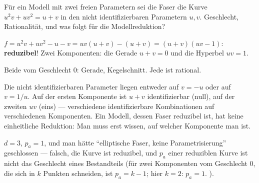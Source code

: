 \begin{aufgabe}
Für ein Modell mit zwei freien Parametern sei die Faser die Kurve $u^{2}v + uv^{2} = u + v$ in den nicht identifizierbaren Parametern $u, v$. Geschlecht, Rationalität, und was folgt für die Modellreduktion?

\loesung
{}
$f = u^{2}v + uv^{2} - u - v = uv(u + v) - (u + v) = (u + v)(uv - 1)$: \textbf{reduzibel}! Zwei Komponenten: die Gerade $u + v = 0$ und die Hyperbel $uv = 1$.

Beide vom Geschlecht $0$: Gerade, Kegelschnitt. Jede ist rational.

Die nicht identifizierbaren Parameter liegen entweder auf $v = -u$ oder auf $v = 1/u$. Auf der ersten Komponente ist $u + v$ identifizierbar (null), auf der zweiten $uv$ (eins) --- verschiedene identifizierbare Kombinationen auf verschiedenen Komponenten. Ein Modell, dessen Faser reduzibel ist, hat keine einheitliche Reduktion: Man muss erst wissen, auf welcher Komponente man ist.

$d = 3$, $p_a = 1$, und man hätte \enquote{elliptische Faser, keine Parametrisierung} geschlossen --- falsch, die Kurve ist reduzibel, und $p_a$ einer reduziblen Kurve ist nicht das Geschlecht eines Bestandteils (für zwei Komponenten vom Geschlecht $0$, die sich in $k$ Punkten schneiden, ist $p_a = k - 1$; hier $k = 2$: $p_a = 1$. \checkmark).

\begin{center}
\begin{minipage}{0.88\textwidth}
\end{minipage}
\end{center}
\end{aufgabe}

